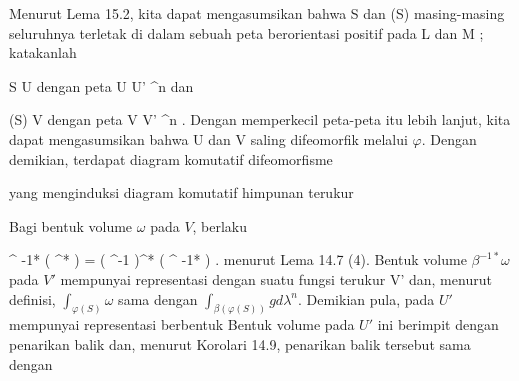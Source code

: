 {

Menurut
Lema 15.2,
kita dapat mengasumsikan bahwa
\mathkor {} {S} {dan} {\varphi(S)} {}
masing-masing seluruhnya terletak di dalam sebuah peta berorientasi positif pada
\mathkor {} {L} {dan} {M} {;}
katakanlah

\mavergleichskette
{\vergleichskette
{ S
}
{ \subseteq }{ U
}
{  }{
}
{    }{
}
{   }{
}
}
{}{}{}
dengan peta
\maabbdisp {\alpha} { U } { U' \subseteq \R^n
} {}
dan

\mavergleichskette
{\vergleichskette
{ \varphi(S)
}
{ \subseteq }{ V
}
{  }{
}
{    }{
}
{   }{
}
}
{}{}{}
dengan peta
\maabbdisp {\beta} { V } { V' \subseteq \R^n
} {.}
Dengan memperkecil peta-peta itu lebih lanjut, kita dapat mengasumsikan bahwa
\mathkor {} {U} {dan} {V} {}
saling difeomorfik melalui $\varphi$. Dengan demikian, terdapat diagram komutatif difeomorfisme

 {  }

yang menginduksi diagram komutatif himpunan terukur

 {  }

Bagi bentuk volume $\omega$ pada $V$, berlaku

\mavergleichskettedisp
{\vergleichskette
{ \alpha^{ {-1}*} ( \varphi^* \omega)
}
{ =} { \left(  \beta \circ \varphi \circ \alpha^{-1}  \right)^*  ( \beta^{ {-1}*} \omega)
}
{ } {
}
{ } {
}
{ } {
}
}
{}{}{.}
menurut
Lema 14.7 (4).
Bentuk volume $\beta^{ {-1}*} \omega$ pada $V'$ mempunyai representasi
 dengan suatu fungsi terukur
 {V'} {\R
} {}
dan, menurut definisi, $\int_{\varphi(S)} \omega$ sama dengan $\int_{\beta( \varphi(S))} g d \lambda^n$. Demikian pula,
 pada $U'$ mempunyai representasi berbentuk
 Bentuk volume pada $U'$ ini berimpit dengan penarikan balik
 dan, menurut
Korolari 14.9,
penarikan balik tersebut sama dengan

}
